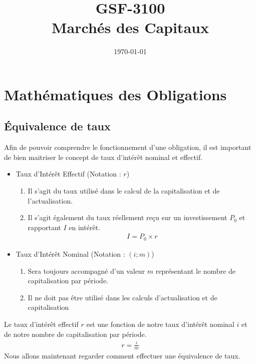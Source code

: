 \documentclass[12pt]{article}
\begin{document}
\begin{titlepage}
\title{GSF-3100 \\ Marchés des Capitaux}
\date{\today}
\maketitle

\setcounter{page}{0}
\thispagestyle{empty}
\end{titlepage}
\pagebreak \newpage

\tableofcontents
\pagebreak \newpage

\chapter{Mathématiques des Obligations}

\section{Équivalence de taux}
Afin de pouvoir comprendre le fonctionnement d'une obligation, il est important de bien maitriser le concept de taux d'intérêt nominal et effectif.

\begin{itemize}
\item Taux d'Intérêt Effectif (Notation : $r$)
\begin{enumerate}
\item Il s'agit du taux utilisé dans le calcul de la capitalisation et de l'actualisation. 
\item Il s'agit également du taux réellement reçu sur un investissement $P_0$ et rapportant $I$ en intérêt.
\begin{align*}
I=P_0 \times r
\end{align*}
\end{enumerate}
\item Taux d'Intérêt Nominal (Notation : $(i;m)$)
\begin{enumerate}
\item Sera toujours accompagné d'un valeur $m$ représentant le nombre de capitalisation par période.
\item Il ne doit pas être utilisé dans les calculs d’actualisation et de capitalisation
\end{enumerate}
\end{itemize}

Le taux d'intérêt effectif $r$ est une fonction de notre taux d'intérêt nominal $i$ et de notre nombre de capitalisation par période. 
\begin{align*}
r=\frac{i}{m}
\end{align*}
Nous allons maintenant regarder comment effectuer une équivalence de taux. 
\end{document}
